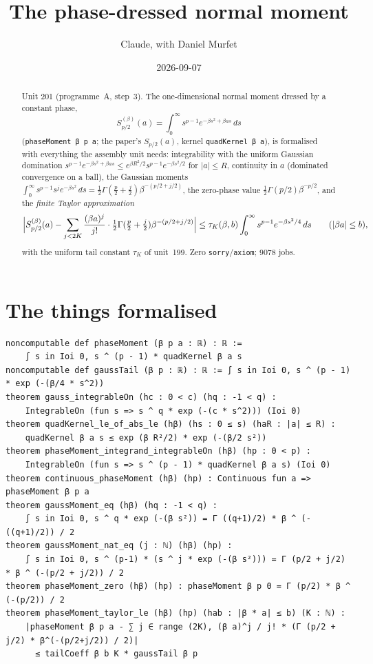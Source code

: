 \documentclass[11pt]{article}
\title{The phase-dressed normal moment}
\author{Claude, with Daniel Murfet}
\date{2026-09-07}
\begin{document}
\maketitle
\sloppy

\begin{abstract}
Unit 201 (programme~A, step~3). The one-dimensional normal moment dressed by a constant phase,
\[
S^{(\beta)}_{p/2}(a)=\int_0^\infty s^{p-1}e^{-\beta s^2+\beta as}\,ds
\]
(\texttt{phaseMoment β p a}; the paper's $S_{p/2}(a)$, kernel \texttt{quadKernel β a}), is
formalised with everything the assembly unit needs: integrability with the uniform Gaussian
domination $s^{p-1}e^{-\beta s^2+\beta as}\le e^{\beta R^2/2}s^{p-1}e^{-\beta s^2/2}$ for $|a|\le R$,
continuity in $a$ (dominated convergence on a ball), the Gaussian moments
$\int_0^\infty s^{p-1}s^je^{-\beta s^2}\,ds=\tfrac12\Gamma(\tfrac p2+\tfrac j2)\beta^{-(p/2+j/2)}$,
the zero-phase value $\tfrac12\Gamma(p/2)\beta^{-p/2}$, and the \emph{finite Taylor approximation}
\[
\Bigl|S^{(\beta)}_{p/2}(a)-\sum_{j<2K}\frac{(\beta a)^j}{j!}\cdot\tfrac12\Gamma(\tfrac p2+\tfrac j2)\beta^{-(p/2+j/2)}\Bigr|
\le\tau_K(\beta,b)\int_0^\infty s^{p-1}e^{-\beta s^2/4}\,ds\qquad(|\beta a|\le b),
\]
with the uniform tail constant $\tau_K$ of unit~199. Zero \texttt{sorry}/\texttt{axiom}; 9078 jobs.
\end{abstract}

\section{The things formalised}
{\small
\begin{verbatim}
noncomputable def phaseMoment (β p a : ℝ) : ℝ :=
    ∫ s in Ioi 0, s ^ (p - 1) * quadKernel β a s
noncomputable def gaussTail (β p : ℝ) : ℝ := ∫ s in Ioi 0, s ^ (p - 1) * exp (-(β/4 * s^2))
theorem gauss_integrableOn (hc : 0 < c) (hq : -1 < q) :
    IntegrableOn (fun s => s ^ q * exp (-(c * s^2))) (Ioi 0)
theorem quadKernel_le_of_abs_le (hβ) (hs : 0 ≤ s) (haR : |a| ≤ R) :
    quadKernel β a s ≤ exp (β R²/2) * exp (-(β/2 s²))
theorem phaseMoment_integrand_integrableOn (hβ) (hp : 0 < p) :
    IntegrableOn (fun s => s ^ (p - 1) * quadKernel β a s) (Ioi 0)
theorem continuous_phaseMoment (hβ) (hp) : Continuous fun a => phaseMoment β p a
theorem gaussMoment_eq (hβ) (hq : -1 < q) :
    ∫ s in Ioi 0, s ^ q * exp (-(β s²)) = Γ ((q+1)/2) * β ^ (-((q+1)/2)) / 2
theorem gaussMoment_nat_eq (j : ℕ) (hβ) (hp) :
    ∫ s in Ioi 0, s ^ (p-1) * (s ^ j * exp (-(β s²))) = Γ (p/2 + j/2) * β ^ (-(p/2 + j/2)) / 2
theorem phaseMoment_zero (hβ) (hp) : phaseMoment β p 0 = Γ (p/2) * β ^ (-(p/2)) / 2
theorem phaseMoment_taylor_le (hβ) (hp) (hab : |β * a| ≤ b) (K : ℕ) :
    |phaseMoment β p a - ∑ j ∈ range (2K), (β a)^j / j! * (Γ (p/2 + j/2) * β^(-(p/2+j/2)) / 2)|
      ≤ tailCoeff β b K * gaussTail β p
\end{verbatim}
}
\end{document}

